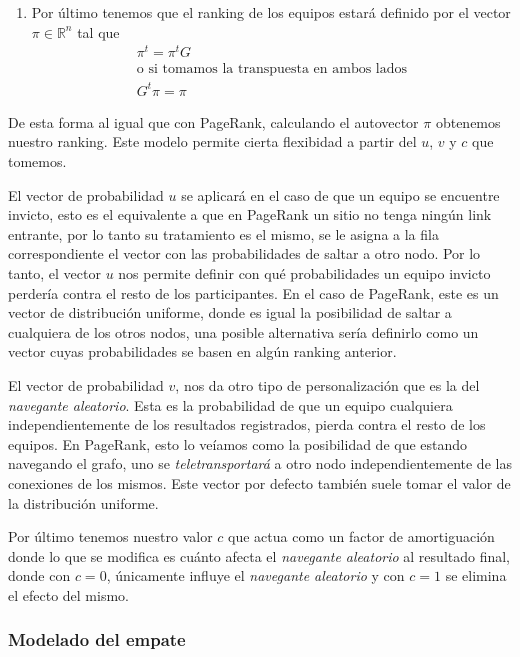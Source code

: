 \begin{enumerate}
	\item Por último tenemos que el ranking de los equipos estará definido por
		el vector $\pi \in \mathbb{R}^n$ tal que
		\begin{gather*}
			\pi^{t} = \pi^{t}G \\
			\text{o si tomamos la transpuesta en ambos lados} \\
			G^{t}\pi = \pi
		\end{gather*}
\end{enumerate}

De esta forma al igual que con PageRank, calculando el autovector $\pi$
obtenemos nuestro ranking. Este modelo permite cierta flexibidad a partir del
$u$, $v$ y $c$ que tomemos.

El vector de probabilidad $u$ se aplicará en el caso de que un equipo se encuentre invicto, esto
es el equivalente a que en PageRank un sitio no tenga ningún link entrante, por
lo tanto su tratamiento es el mismo, se le asigna a la fila correspondiente el
vector con las probabilidades de saltar a otro nodo. Por lo tanto, el vector $u$
nos permite definir con qué probabilidades un equipo invicto perdería contra el
resto de los participantes. En el caso de PageRank, este es un vector de
distribución uniforme, donde es igual la posibilidad de saltar a cualquiera de
los otros nodos, una posible alternativa sería definirlo como un vector cuyas
probabilidades se basen en algún ranking anterior.

El vector de probabilidad $v$, nos da otro tipo de personalización que es
la del \textit{navegante aleatorio}. Esta es la probabilidad de que un equipo
cualquiera independientemente de los resultados registrados, pierda contra el
resto de los equipos. En PageRank, esto lo veíamos como la posibilidad de que
estando navegando el grafo, uno se \textit{teletransportará} a otro nodo
independientemente de las conexiones de los mismos. Este vector por defecto
también suele tomar el valor de la distribución uniforme.

Por último tenemos nuestro valor $c$ que actua como un factor de amortiguación
donde lo que se modifica es cuánto afecta el \textit{navegante aleatorio} al
resultado final, donde con $c = 0$, únicamente influye el \textit{navegante
aleatorio} y con $c = 1$ se elimina el efecto del mismo.

\subsubsection*{Modelado del empate}

